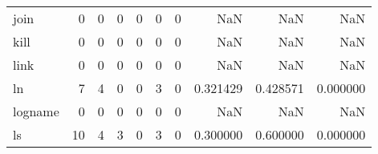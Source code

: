 \begin{longtable}{lrrrrrrrrr}
join      &                                                  0 &                                                  0 &                                                  0 &                                                  0 &                                                  0 &                                                  0 &                                                NaN &                                    NaN &                                  NaN \\
kill      &                                                  0 &                                                  0 &                                                  0 &                                                  0 &                                                  0 &                                                  0 &                                                NaN &                                    NaN &                                  NaN \\
link      &                                                  0 &                                                  0 &                                                  0 &                                                  0 &                                                  0 &                                                  0 &                                                NaN &                                    NaN &                                  NaN \\
ln        &                                                  7 &                                                  4 &                                                  0 &                                                  0 &                                                  3 &                                                  0 &                                           0.321429 &                               0.428571 &                             0.000000 \\
logname   &                                                  0 &                                                  0 &                                                  0 &                                                  0 &                                                  0 &                                                  0 &                                                NaN &                                    NaN &                                  NaN \\
ls        &                                                 10 &                                                  4 &                                                  3 &                                                  0 &                                                  3 &                                                  0 &                                           0.300000 &                               0.600000 &                             0.000000 \\

\end{longtable}
